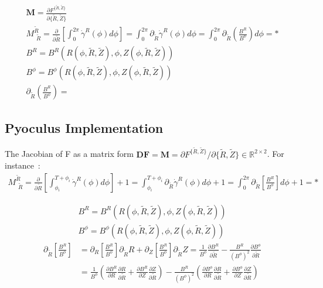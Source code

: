 \begin{align*}
    \textbf{M} = \frac{\partial F^{\{\tilde{R},\tilde{Z}\}}}{\partial \{\tilde{R},\tilde{Z}\}}\\
    M^{\tilde{R}}_{\,\:\tilde{R}} = \frac{\partial}{\partial \tilde{R}}\left[\int_0^{2\pi}\dot{\gamma}^R(\phi)d\phi\right] = \int_0^{2\pi}\partial_{\tilde{R}}\dot{\gamma}^R(\phi)d\phi = \int_0^{2\pi}\partial_{\tilde{R}}\left(\frac{B^R}{B^\phi}\right)d\phi = *\\
    B^R = B^R(R(\phi, \tilde{R}, \tilde{Z}), \phi, Z(\phi, \tilde{R}, \tilde{Z}))\\
    B^\phi = B^\phi(R(\phi, \tilde{R}, \tilde{Z}), \phi, Z(\phi, \tilde{R}, \tilde{Z}))\\
    \partial_{\tilde{R}}\left(\frac{B^R}{B^\phi}\right) = 
\end{align*}

\subsection{Pyoculus Implementation}

The Jacobian of F as a matrix form $\textbf{DF} = \textbf{M} = \partial F^{\{\tilde{R},\tilde{Z}\}}/{\partial \{\tilde{R},\tilde{Z}\}} \in \mathbb{R}^{2\times2}$. For instance~:
\begin{align*}
    M^{\tilde{R}}_{\,\:\tilde{R}} = \frac{\partial}{\partial \tilde{R}}\left[\int_{\phi_i}^{T+\phi_i}\dot{\gamma}^R(\phi)d\phi\right] + 1 = \int_{\phi_i}^{T+\phi_i}\partial_{\tilde{R}}\dot{\gamma}^R(\phi)d\phi + 1 = \int_0^{2\pi}\partial_{\tilde{R}}\left[\frac{B^R}{B^\phi}\right]d\phi + 1 = *
\end{align*}

\begin{align*}
  B^R = B^R(R(\phi, \tilde{R}, \tilde{Z}), \phi, Z(\phi, \tilde{R}, \tilde{Z}))\\
    B^\phi = B^\phi(R(\phi, \tilde{R}, \tilde{Z}), \phi, Z(\phi, \tilde{R}, \tilde{Z}))
\end{align*}
\begin{align*}
    \partial_{\tilde{R}}\left[\frac{B^R}{B^\phi}\right] &= \partial_{R}\left[\frac{B^R}{B^\phi}\right]\partial_{\tilde{R}}R + \partial_{Z}\left[\frac{B^R}{B^\phi}\right]\partial_{\tilde{R}}Z = \frac{1}{B^\phi}\frac{\partial B^R}{\partial\tilde{R}} - \frac{B^R}{(B^\phi)^2}\frac{\partial B^\phi}{\partial\tilde{R}} \\&= \frac{1}{B^\phi}\left(\frac{\partial B^R}{\partial R}\frac{\partial R}{\partial\tilde{R}}+\frac{\partial B^R}{\partial Z}\frac{\partial Z}{\partial\tilde{R}}\right) - \frac{B^R}{(B^\phi)^2}\left(\frac{\partial B^\phi}{\partial R}\frac{\partial R}{\partial\tilde{R}}+\frac{\partial B^\phi}{\partial Z}\frac{\partial Z}{\partial\tilde{R}}\right)
\end{align*}

